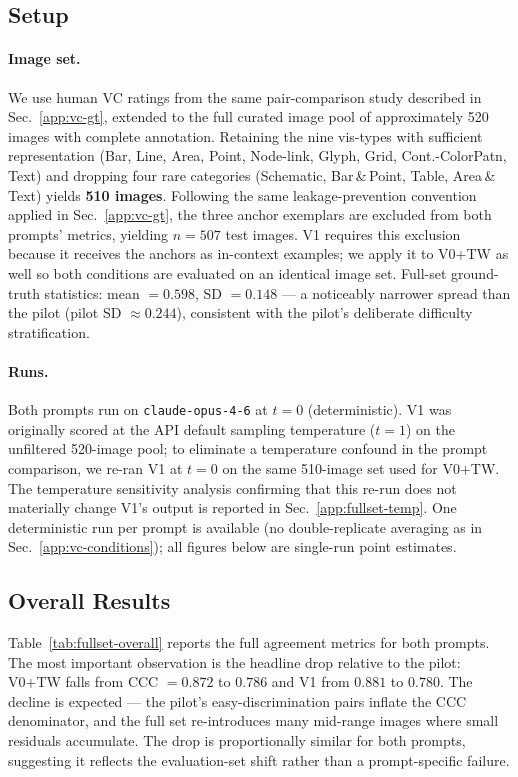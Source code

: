 \subsection{Setup}
\label{app:fullset-setup}

\paragraph{Image set.}
We use human VC ratings from the same pair-comparison study described in
Sec.~\ref{app:vc-gt}, extended to the full curated image pool of
approximately 520 images with complete annotation. Retaining the nine
vis-types with sufficient representation (Bar, Line, Area, Point,
Node-link, Glyph, Grid, Cont.-ColorPatn, Text) and dropping four
rare categories (Schematic, Bar\,\&\,Point, Table, Area\,\&\,Text) yields
\textbf{510 images}. Following the same leakage-prevention convention
applied in Sec.~\ref{app:vc-gt}, the three anchor exemplars are excluded
from both prompts' metrics, yielding $n = 507$ test images. V1 requires
this exclusion because it receives the anchors as in-context examples;
we apply it to V0+TW as well so both conditions are evaluated on an
identical image set.
Full-set ground-truth statistics: mean $= 0.598$, SD $= 0.148$ --- a
noticeably narrower spread than the pilot (pilot SD $\approx 0.244$),
consistent with the pilot's deliberate difficulty stratification.

\paragraph{Runs.}
Both prompts run on \texttt{claude-opus-4-6} at $t = 0$ (deterministic).
V1 was originally scored at the API default sampling temperature ($t = 1$)
on the unfiltered 520-image pool; to eliminate a temperature confound
in the prompt comparison, we re-ran V1 at $t = 0$ on the same 510-image
set used for V0+TW. The temperature sensitivity analysis confirming that
this re-run does not materially change V1's output is reported in
Sec.~\ref{app:fullset-temp}. One deterministic run per prompt is
available (no double-replicate averaging as in
Sec.~\ref{app:vc-conditions}); all figures below are single-run point
estimates.

\subsection{Overall Results}
\label{app:fullset-overall}

Table~\ref{tab:fullset-overall} reports the full agreement metrics for
both prompts. The most important observation is the headline drop
relative to the pilot: V0+TW falls from CCC $= 0.872$ to $0.786$ and
V1 from $0.881$ to $0.780$. The decline is expected --- the pilot's
easy-discrimination pairs inflate the CCC denominator, and the full
set re-introduces many mid-range images where small residuals
accumulate. The drop is proportionally similar for both prompts,
suggesting it reflects the evaluation-set shift rather than a
prompt-specific failure.

